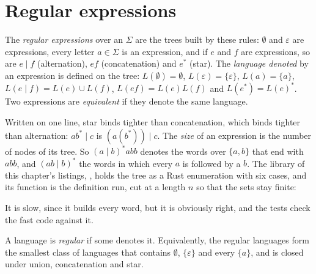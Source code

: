 \section{Regular expressions}\label{sec:b2:regular-languages:regex}

\begin{definition}\label{def:b2:regular-languages:regex}
The \emph{regular expressions} over an  $\Sigma$ are the trees built by these rules:
$\emptyset$ and $\varepsilon$ are expressions, every letter $a \in \Sigma$ is an expression, and if $e$ and $f$ are
expressions, so are $e \mid f$ (alternation), $ef$ (concatenation) and $e^*$ (star). The \emph{language
denoted} by an expression is defined on the tree: $L(\emptyset) = \emptyset$, $L(\varepsilon)
= \{\varepsilon\}$, $L(a) = \{a\}$, $L(e \mid f) = L(e) \cup L(f)$, $L(ef) = L(e) L(f)$ and $L(e^*) = L(e)^*$. Two
expressions are \emph{equivalent} if they denote the same language.
\end{definition}

Written on one line, star binds tighter than concatenation, which binds tighter than alternation: $ab^* \mid c$ is
$(a(b^*)) \mid c$. The \emph{size} of an expression is the number of nodes of its tree. So $(a \mid b)^*abb$ denotes the
words over $\{a, b\}$ that end with $abb$, and $(ab \mid b)^*$ the words in which every $a$ is followed by a $b$. The
library of this chapter's listings, , holds the tree as a Rust enumeration with six cases, and its
function  is the definition run, cut at a length $n$ so that the sets stay finite:

\label{lst:b2:regular-languages:lang}

It is slow, since it builds every word, but it is obviously right, and the tests check the fast code against it.

\begin{definition}\label{def:b2:regular-languages:regular}
A language is \emph{regular} if some  denotes it. Equivalently, the regular
languages form the smallest class of languages that contains $\emptyset$, $\{\varepsilon\}$ and every $\{a\}$, and is
closed under union, concatenation and star.
\end{definition}

